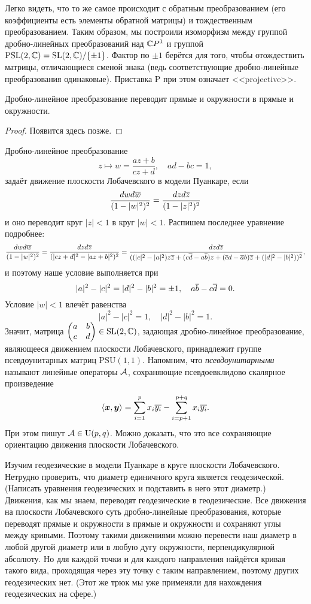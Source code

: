 Легко видеть, что то же самое происходит с обратным преобразованием (его коэффициенты есть элементы обратной матрицы) и тождественным преобразованием. Таким образом, мы построили изоморфизм между группой дробно-линейных преобразований над $\mathbb{C} P^1$ и группой $\mathrm{PSL}(2, \mathbb{C}) = \mathrm{SL}(2, \mathbb{C}) / \{\pm 1\}$. Фактор по $\pm 1$ берётся для того, чтобы отождествить матрицы, отличающиеся сменой знака (ведь соответствующие дробно-линейные преобразования одинаковые). Приставка $\mathrm{P}$ при этом означает <<projective>>.

\begin{proposition}
	Дробно-линейное преобразование переводит прямые и окружности в прямые и окружности.
\end{proposition}

\begin{proof}
	Появится здесь позже.
\end{proof}

\noindent
Дробно-линейное преобразование
\[
	z \mapsto w = \frac{az + b}{cz + d},\quad ad - bc = 1,
\]
задаёт движение плоскости Лобачевского в модели Пуанкаре, если
\[
	\frac{dwd\overline{w}}{(1 - |w|^2)^2} = \frac{dzd\overline{z}}{(1 - |z|^2)^2}
\]
и оно переводит круг $|z| < 1$ в круг $|w| < 1$. Распишем последнее уравнение подробнее:
\[
	\frac{dwd\overline{w}}{(1 - |w|^2)^2} = \frac{dzd\overline{z}}{(|cz + d|^2 - |az + b|^2)^2} = \frac{dzd\overline{z}}{((|c|^2 - |a|^2)z\overline{z} + (c\overline{d} - a\overline{b})z + (\overline{c}d - \overline{a}b)\overline{z} + (|d|^2 - |b|^2))^2},
\]
и поэтому наше условие выполняется при
\[
	|a|^2 - |c|^2 = |d|^2 - |b|^2 = \pm 1,\quad a\overline{b} - c\overline{d} = 0.
\]
Условие $|w| < 1$ влечёт равенства
\[
	|a|^2 - |c|^2 = 1,\quad |d|^2 - |b|^2 = 1.
\]
Значит, матрица
$\begin{pmatrix}
	a & b\\
	c & d
\end{pmatrix} \in \mathrm{SL}(2, \mathbb{C})$, задающая дробно-линейное преобразование, являющееся движением плоскости Лобачевского, принадлежит группе псевдоунитарных матриц $\mathrm{PSU}(1, 1)$. Напомним, что \textit{псевдоунитарными} называют линейные операторы $\mathcal{A}$, сохраняющие псевдоевклидово скалярное произведение
\[
	\langle\boldsymbol{x}, \boldsymbol{y}\rangle = \sum_{i = 1}^px_i\overline{y_i} - \sum_{i = p + 1}^{p + q}x_i\overline{y_i}.
\]
При этом пишут $\mathcal{A} \in \mathrm{U}(p, q)$. Можно доказать, что это все сохраняющие ориентацию движения плоскости Лобачевского.

Изучим геодезические в модели Пуанкаре в круге плоскости Лобачевского. Нетрудно проверить, что диаметр единичного круга является геодезической. (Написать уравнения геодезических и подставить в него этот диаметр.) Движения, как мы знаем, переводят геодезические в геодезические. Все движения на плоскости Лобачевского суть дробно-линейные преобразования, которые переводят прямые и окружности в прямые и окружности и сохраняют углы между кривыми. Поэтому такими движениями можно перевести наш диаметр в любой другой диаметр или в любую дугу окружности, перпендикулярной абсолюту. Но для каждой точки и для каждого направления найдётся кривая такого вида, проходящая через эту точку с таким направлением, поэтому других геодезических нет. (Этот же трюк мы уже применяли для нахождения геодезических на сфере.)


